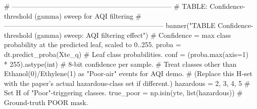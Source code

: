     # ---------------------------------------------------------------------
    # TABLE: Confidence-threshold (gamma) sweep for AQI filtering
    # ---------------------------------------------------------------------
    banner("TABLE  Confidence-threshold (gamma) sweep: AQI filtering effect")
    # Confidence = max class probability at the predicted leaf, scaled to 0..255.
    proba = dt.predict_proba(Xte_q)                     # Leaf class probabilities.
    conf = (proba.max(axis=1) * 255).astype(int)        # 8-bit confidence per sample.
    # Treat classes other than Ethanol(0)/Ethylene(1) as "Poor-air" events for AQI demo.
    # (Replace this H-set with the paper's actual hazardous-class set if different.)
    hazardous = {2, 3, 4, 5}                            # Set H of "Poor"-triggering classes.
    true_poor = np.isin(yte, list(hazardous))           # Ground-truth POOR mask.
